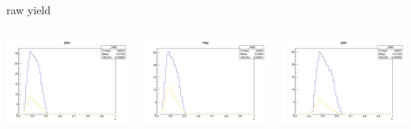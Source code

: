 \begin{frame}{raw yield}
\begin{columns}
\begin{column}[T]{0.25\textwidth}
\includegraphics[width = \textwidth]{results/yield/statistics/yield_x_Q2_z_0.35_4.000_0.40_pos.png}
\end{column}
\begin{column}[T]{0.25\textwidth}
\includegraphics[width = \textwidth]{results/yield/statistics/yield_x_Q2_z_0.35_4.000_0.40_neg.png}
\end{column}
\begin{column}[T]{0.25\textwidth}
\includegraphics[width = \textwidth]{results/yield/statistics/yield_x_Q2_z_0.35_4.000_0.50_pos.png}

\end{column}
\end{columns}
\end{frame}
